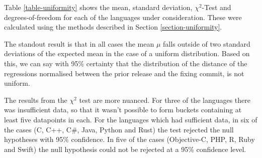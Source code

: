 \documentclass[10pt,journal,compsoc]{IEEEtran}
\begin{document}
Table \ref{table-uniformity} shows the mean, standard deviation, $\chi^2$-Test and degrees-of-freedom for each of the languages under consideration. These were calculated using the methods described in Section \ref{section-uniformity}.

The standout result is that in all cases the mean $\mu$ falls outside of two standard deviations of the expected mean in the case of a uniform distribution. Based on this, we can say with 95\% certainty that the distribution of the distance of the regressions normalised between the prior release and the fixing commit, is not uniform.

The results from the $\chi^2$ test are more nuanced. For three of the languages there was insufficient data, so that it wasn't possible to form buckets containing at least five datapoints in each. For the languages which had sufficient data, in six of the cases (C, C++, C\#, Java, Python and Rust) the test rejected the null hypotheses with 95\% confidence. In five of the cases (Objective-C, PHP, R, Ruby and Swift) the null hypothesis could not be rejected at a 95\% confidence level.
\end{document}
